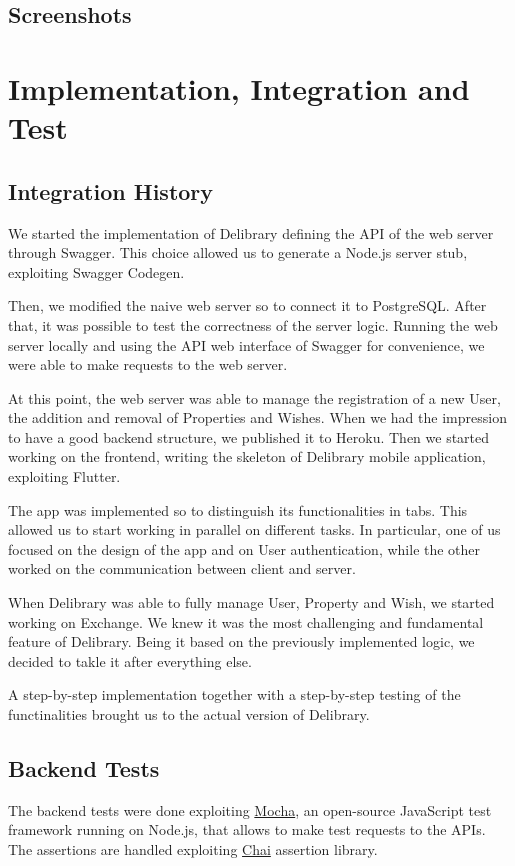 \section{Screenshots}



\chapter{Implementation, Integration and Test}

\section{Integration History}
We started the implementation of Delibrary defining the API of the web server through Swagger.
This choice allowed us to generate a Node.js server stub, exploiting Swagger Codegen.

Then, we modified the naive web server so to connect it to PostgreSQL.
After that, it was possible to test the correctness of the server logic.
Running the web server locally and using the API web interface of Swagger for convenience, we were able to make requests to the web server.

At this point, the web server was able to manage the registration of a new User, the addition and removal of Properties and Wishes.
When we had the impression to have a good backend structure, we published it to Heroku.
Then we started working on the frontend, writing the skeleton of Delibrary mobile application, exploiting Flutter.

The app was implemented so to distinguish its functionalities in tabs. This allowed us to start working in parallel on different tasks.
In particular, one of us focused on the design of the app and on User authentication, while the other worked on the communication between client and server.

When Delibrary was able to fully manage User, Property and Wish, we started working on Exchange.
We knew it was the most challenging and fundamental feature of Delibrary.
Being it based on the previously implemented logic, we decided to takle it after everything else.

A step-by-step implementation together with a step-by-step testing of the functinalities brought us to the actual version of Delibrary.

\section{Backend Tests}
The backend tests were done exploiting \href{https://mochajs.org}{Mocha}, an open-source JavaScript test framework running on Node.js, that allows to make test requests to the APIs.
The assertions are handled exploiting \href{https://www.chaijs.com/}{Chai} assertion library.

